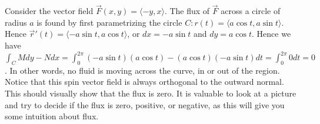 \begin{example}
%
 Consider the vector field {$\vec F(x,y)=\langle-y,x\rangle$}.  The flux of
  {$\vec F$} across a circle of radius $a$ is found by first
  parametrizing the circle $C\colon r(t) = \langle a\cos t,a\sin t\rangle$.  Hence $\vec
  r'(t) = \langle-a\sin t,a\cos t\rangle$, or $dx=-a\sin t$ and $dy = a\cos
  t$. Hence we have $\int_C Mdy-Ndx = \int_0^{2\pi} (-a\sin t)(a\cos t)-(a\cos
  t)(-a\sin t)dt = \int_0^{2\pi} 0 dt = 0$.  In other words, no fluid is
  moving across the curve, in or out of the region.  Notice that this
  spin vector field is always orthogonal to the outward normal. This should
  visually show that the flux is zero. It is valuable to look at a
  picture and try to decide if the flux is zero, positive, or
  negative, as this will give you some intuition about flux.
\end{example}

